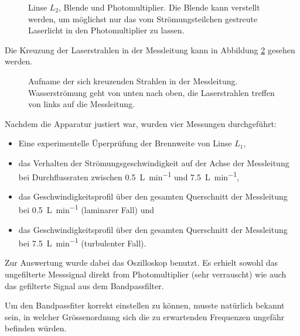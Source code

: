 \begin{figure}[h!t]
    \centering
    \resizebox{.67\textwidth}{!}{}
    \caption{%
        Linse  $L_2$, Blende  und Photomultiplier. Die  Blende kann  verstellt
        werden,  um  m\"oglichst  nur  das  vom Str\"omungsteilchen  gestreute
        Laserlicht in den Photomultiplier zu lassen.
    }
    \label{fig:versuchsanordnung:blende}
\end{figure}

Die  Kreuzung  der   Laserstrahlen  in  der  Messleitung   kann  in  Abbildung
\ref{fig:laserkreuzung} gesehen werden.

\begin{figure}[h!t]
    \centering
    \resizebox{.67\textwidth}{!}{}
    \caption{%
        Aufname      der     sich      kreuzenden     Strahlen      in     der
        Messleitung. Wasserstr\"omung   geht   von   unten  nach   oben,   die
        Laserstrahlen treffen von links auf die Messleitung.
    }
    \label{fig:laserkreuzung}
\end{figure}

Nachdem die Apparatur justiert war, wurden vier Messungen durchgef\"uhrt:

\begin{itemize}
    \item
        Eine experimentelle \"Uperpr\"ufung der Brennweite von Linse $L_1$,
    \item
        das  Verhalten  der  Str\"omungsgeschwindigkeit   auf  der  Achse  der
        Messleitung  bei Durchflussraten  zwischen \SI{0.5}{\liter\per\minute}
        und \SI{7.5}{\liter\per\minute},
    \item
        das  Geschwindigkeitsprofil   \"uber  den  gesamten   Querschnitt  der
        Messleitung bei \SI{0.5}{\liter\per\minute} (laminarer Fall) und
    \item
        das  Geschwindigkeitsprofil   \"uber  den  gesamten   Querschnitt  der
        Messleitung bei \SI{7.5}{\liter\per\minute} (turbulenter Fall).
\end{itemize}

Zur  Auswertung wurde  dabei das  Oszilloskop benutzt. Es  erhielt sowohl  das
ungefilterte Messsignal direkt from Photomultiplier (sehr verrauscht) wie auch
das gefilterte Signal aus dem Bandpassfilter.

Um  den  Bandpassfiter  korrekt  einstellen zu  k\"onnen,  musste  nat\"urlich
bekannt sein, in  welcher Gr\"ossenordnung sich die  zu erwartenden Frequenzen
ungef\"ahr befinden w\"urden.

